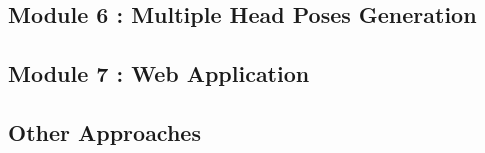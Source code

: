 \newpage

\subsection{Module 6 : Multiple Head Poses Generation}
\label{sec:poses}


\newpage

\subsection{Module 7 : Web Application}
\label{sec:web_app}


\newpage

\subsection{Other Approaches}
\label{sec:other_app}

